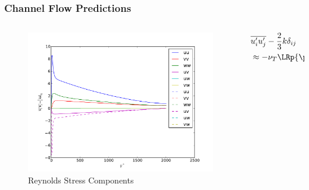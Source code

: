 \documentclass{beamer}
\begin{document}
\begin{frame}\frametitle{Channel Flow Predictions}
\begin{columns}[c]
\begin{column}{0.7\textwidth}
\begin{figure}[t]
	\begin{center}
		\includegraphics[width=\textwidth]{ReynoldsStress.pdf}
	\end{center}
	\caption{Reynolds Stress Components}
\end{figure}
\end{column}
\hspace{-3em}
\begin{column}{0.3\textwidth}
\begin{align*}
&\overline{u_i'u_j'}-\frac{2}{3}k\delta_{ij}\\
&\approx-\nu_T\LRp{\pd{\bar u_i}{x_j}+\pd{\bar u_j}{x_i}}
\end{align*}
\end{column}
\end{columns}
\end{frame}
\end{document}
